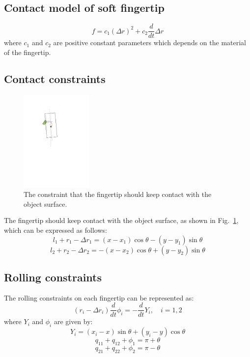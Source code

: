 \documentclass[]{article}
\begin{document}
\subsection{Contact model of soft fingertip}
\begin{equation}
f=c_1(\Delta r)^2+ c_2\frac{d}{dt}\Delta r
\end{equation}
where $c_1$ and $c_2$ are positive constant parameters which depends on the material of the fingertip.
\subsection{Contact constraints}
\begin{figure}[h!]
\centering
\includegraphics[height=5cm]{hand_object_cons1.pdf}
\caption{The constraint that the fingertip should keep contact with the object surface.}
\label{fig::cons1}
\end{figure}
The fingertip should keep contact with the object surface, as shown in Fig.~\ref{fig::cons1}, which can be expressed as follows:
\begin{equation}
l_1+r_1-\Delta r_1=(x-x_1)\cos\theta-(y-y_1)\sin\theta
\label{eqn::cons_contact1}
\end{equation}
\begin{equation}
l_2+r_2-\Delta r_2=-(x-x_2)\cos\theta+(y-y_2)\sin\theta
\label{eqn::cons_contact2}
\end{equation}
\subsection{Rolling constraints}
The rolling constraints on each fingertip can be represented as:
\begin{equation}
(r_i-\Delta r_i)\frac{d}{dt}\phi_i=-\frac{d}{dt}Y_i,\quad i=1,2
\label{eqn::cons_rolling}
\end{equation}
where $Y_i$ and $\phi_i$ are given by:
\begin{equation}
Y_i=(x_i-x)\sin\theta+(y_i-y)\cos\theta
\end{equation}
\begin{equation}
q_{11}+q_{12}+\phi_1=\pi+\theta
\end{equation}
\begin{equation}
q_{21}+q_{22}+\phi_2=\pi-\theta
\end{equation}
\end{document}
